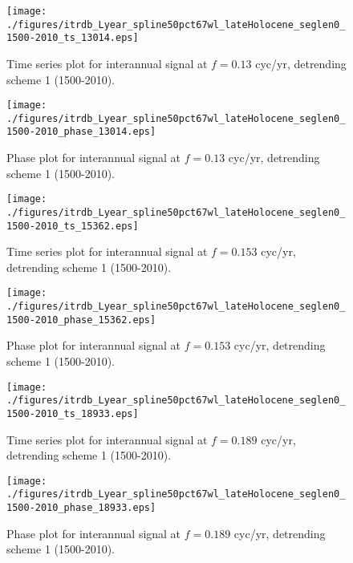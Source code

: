 \documentclass[phd,tocprelim]{cornell}
\begin{document}
\clearpage
\newpage

\begin{figure}[!tbp]
\centering
\begin{minipage}[b]{0.45\textwidth}
\texttt{[image: ./figures/itrdb\_Lyear\_spline50pct67wl\_lateHolocene\_seglen0\_1500-2010\_ts\_13014.eps]}
\caption{Time series plot for interannual signal at $f=0.13$ cyc/yr, detrending scheme 1 (1500-2010).}
\label{ts1p1}
\end{minipage}
\hfill
\begin{minipage}[b]{0.45\textwidth}
\texttt{[image: ./figures/itrdb\_Lyear\_spline50pct67wl\_lateHolocene\_seglen0\_1500-2010\_phase\_13014.eps]}
\caption{Phase plot for interannual signal at $f=0.13$ cyc/yr, detrending scheme 1 (1500-2010).}
\label{map1p1}
\end{minipage}
\end{figure}


\begin{figure}[!tbp]
\centering
\begin{minipage}[b]{0.45\textwidth}
\texttt{[image: ./figures/itrdb\_Lyear\_spline50pct67wl\_lateHolocene\_seglen0\_1500-2010\_ts\_15362.eps]}
\caption{Time series plot for interannual signal at $f=0.153$ cyc/yr, detrending scheme 1 (1500-2010).}
\label{ts1p2}
\end{minipage}
\hfill
\begin{minipage}[b]{0.45\textwidth}
\texttt{[image: ./figures/itrdb\_Lyear\_spline50pct67wl\_lateHolocene\_seglen0\_1500-2010\_phase\_15362.eps]}
\caption{Phase plot for interannual signal at $f=0.153$ cyc/yr, detrending scheme 1 (1500-2010).}
\label{map1p2}
\end{minipage}
\end{figure}

\begin{figure}[!tbp]
\centering
\begin{minipage}[b]{0.45\textwidth}
\texttt{[image: ./figures/itrdb\_Lyear\_spline50pct67wl\_lateHolocene\_seglen0\_1500-2010\_ts\_18933.eps]}
\caption{Time series plot for interannual signal at $f=0.189$ cyc/yr, detrending scheme 1 (1500-2010).}
\label{ts1p3}
\end{minipage}
\hfill
\begin{minipage}[b]{0.45\textwidth}
\texttt{[image: ./figures/itrdb\_Lyear\_spline50pct67wl\_lateHolocene\_seglen0\_1500-2010\_phase\_18933.eps]}
\caption{Phase plot for interannual signal at $f=0.189$ cyc/yr, detrending scheme 1 (1500-2010).}
\label{map1p3}
\end{minipage}
\end{figure}
\end{document}
